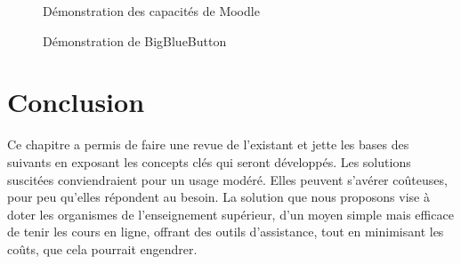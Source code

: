 \begin{figure}[H]
  \centering
  \caption{Démonstration des capacités de Moodle}
  \label{fig:moodle_demo}
\end{figure}

\begin{figure}[H]
  \centering
  \caption{Démonstration de BigBlueButton}
  \label{fig:bbg_demo}
\end{figure}

\section*{Conclusion}
Ce chapitre a permis de faire une revue de l’existant et jette les bases des 
suivants en exposant les concepts clés qui seront développés. 
Les solutions suscitées conviendraient pour un usage modéré. 
Elles peuvent s'avérer coûteuses, pour peu qu’elles répondent au besoin. 
La solution que nous proposons vise à doter les organismes de l’enseignement supérieur, 
d’un moyen simple mais efficace de tenir les cours en ligne, offrant des outils d’assistance, 
tout en minimisant les coûts, que cela pourrait engendrer.
